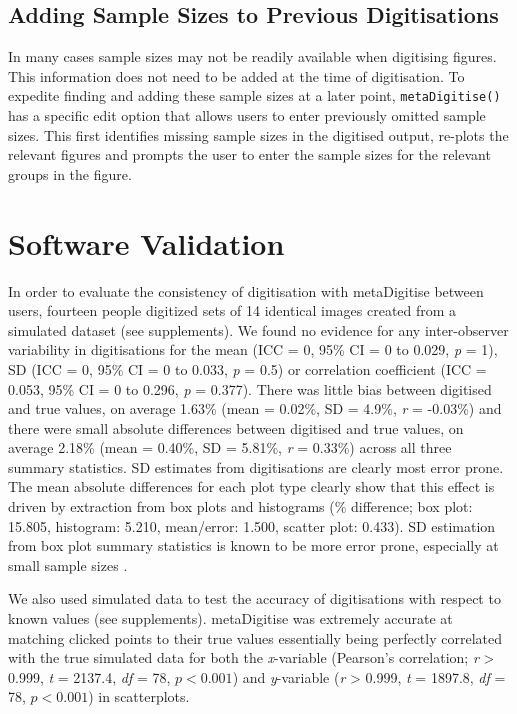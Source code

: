 \documentclass[12pt]{article}
\newcommand{\fct}[1]{\texttt{#1()}}
\newcommand{\pkg}[1]{{\fontseries{b}\selectfont #1}}
\begin{document}
\subsection{Adding Sample Sizes to Previous Digitisations}
In many cases sample sizes may not be readily available when digitising figures. This information does not need to be added at the time of digitisation. To expedite finding and adding these sample sizes at a later point, \fct{metaDigitise} has a specific edit option that allows users to enter previously omitted sample sizes. This first identifies missing sample sizes in the digitised output, re-plots the relevant figures and prompts the user to enter the sample sizes for the relevant groups in the figure. 





\section{Software Validation}
In order to evaluate the consistency of digitisation with \pkg{metaDigitise} between users, fourteen people digitized sets of 14 identical images created from a simulated dataset (see supplements). We found no evidence for any inter-observer variability in digitisations for the mean (ICC = 0, 95\% CI = 0 to 0.029, \textit{p} = 1), SD (ICC = 0, 95\% CI = 0 to 0.033, \textit{p} = 0.5) or correlation coefficient (ICC = 0.053, 95\% CI = 0 to 0.296, \textit{p} = 0.377). There was little bias between digitised and true values, on average 1.63\% (mean = 0.02\%, SD = 4.9\%, \textit{r} = -0.03\%) and there were small absolute differences between digitised and true values, on average 2.18\% (mean = 0.40\%, SD = 5.81\%, \textit{r} = 0.33\%) across all three summary statistics. SD estimates from digitisations are clearly most error prone. The mean absolute differences for each plot type clearly show that this effect is driven by extraction from box plots and histograms (\% difference; box plot: 15.805, histogram: 5.210, mean/error: 1.500, scatter plot: 0.433). SD estimation from box plot summary statistics is known to be more error prone, especially at small sample sizes \citep{Wan2014}. 

We also used simulated data to test the accuracy of digitisations with respect to known values (see supplements). \pkg{metaDigitise} was extremely accurate at matching clicked points to their true values essentially being perfectly correlated with the true simulated data for both the \textit{x}-variable (Pearson's correlation; \textit{r} > 0.999, \textit{t} = 2137.4, \textit{df} = 78, $p < 0.001$) and \textit{y}-variable (\textit{r} > 0.999, \textit{t} = 1897.8, \textit{df} = 78, $p < 0.001$) in scatterplots.
\end{document}
